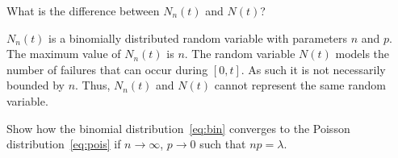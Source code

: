 \begin{question}
What is the difference between $N_n(t)$ and $N(t)$?
\begin{solution}
  $N_n(t)$ is a binomially distributed random variable with parameters
  $n$ and $p$. The maximum value of $N_n(t)$ is $n$. The random
  variable $N(t)$ models the number of failures that can occur during
  $[0,t]$. As such it is not necessarily bounded by $n$. Thus, $N_n(t)$ and $N(t)$ cannot represent the same random variable. 
\end{solution}
\end{question}

\begin{question}
  Show how the binomial distribution~\eqref{eq:bin} converges to the
  Poisson distribution~\eqref{eq:pois} if $n\to\infty$, $p\to0$ such
  that $np=\lambda$. 



\end{question}
